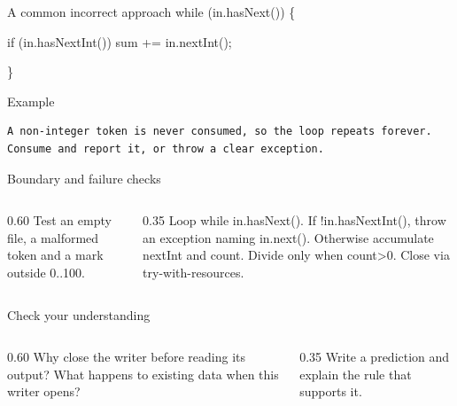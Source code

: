 \documentclass[10pt,aspectratio=169]{beamer}
\begin{document}
\begin{frame}[fragile,t]{A common incorrect approach}
while (in.hasNext()) \{\par   if (in.hasNextInt()) sum += in.nextInt();\par \}
\vspace{1mm}\begin{block}{Example}
\begin{lstlisting}
A non-integer token is never consumed, so the loop repeats forever. Consume and report it, or throw a clear exception.
\end{lstlisting}
\end{block}
\end{frame}

\begin{frame}[fragile,t]{Boundary and failure checks}
\begin{columns}[T,onlytextwidth]\begin{column}{0.60\textwidth}
Test an empty file, a malformed token and a mark outside 0..100.
\end{column}\begin{column}{0.35\textwidth}\small
Loop while in.hasNext(). If !in.hasNextInt(), throw an exception naming in.next(). Otherwise accumulate nextInt and count. Divide only when count\textgreater{}0. Close via try-with-resources.
\end{column}\end{columns}
\end{frame}

\begin{frame}[fragile,t]{Check your understanding}
\begin{columns}[T,onlytextwidth]\begin{column}{0.60\textwidth}
Why close the writer before reading its output? What happens to existing data when this writer opens?
\end{column}\begin{column}{0.35\textwidth}\small
Write a prediction and explain the rule that supports it.
\end{column}\end{columns}
\end{frame}
\end{document}
